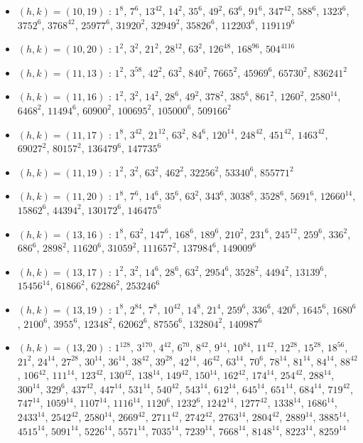 \begin{itemize}
\item $(h,k)=(10,19)$ : $1^{8}$, $7^{6}$, $13^{42}$, $14^{2}$, $35^{6}$, $49^{2}$, $63^{6}$, $91^{6}$, $347^{42}$, $588^{6}$, $1323^{6}$, $3752^{6}$, $3768^{42}$, $25977^{6}$, $31920^{2}$, $32949^{2}$, $35826^{6}$, $112203^{6}$, $119119^{6}$
\item $(h,k)=(10,20)$ : $1^{2}$, $3^{2}$, $21^{2}$, $28^{12}$, $63^{2}$, $126^{48}$, $168^{96}$, $504^{4116}$
\item $(h,k)=(11,13)$ : $1^{2}$, $3^{58}$, $42^{2}$, $63^{2}$, $840^{2}$, $7665^{2}$, $45969^{6}$, $65730^{2}$, $836241^{2}$
\item $(h,k)=(11,16)$ : $1^{2}$, $3^{2}$, $14^{2}$, $28^{6}$, $49^{2}$, $378^{2}$, $385^{6}$, $861^{2}$, $1260^{2}$, $2580^{14}$, $6468^{2}$, $11494^{6}$, $60900^{2}$, $100695^{2}$, $105000^{6}$, $509166^{2}$
\item $(h,k)=(11,17)$ : $1^{8}$, $3^{42}$, $21^{12}$, $63^{2}$, $84^{6}$, $120^{14}$, $248^{42}$, $451^{42}$, $1463^{42}$, $69027^{2}$, $80157^{2}$, $136479^{6}$, $147735^{6}$
\item $(h,k)=(11,19)$ : $1^{2}$, $3^{2}$, $63^{2}$, $462^{2}$, $32256^{2}$, $53340^{6}$, $855771^{2}$
\item $(h,k)=(11,20)$ : $1^{8}$, $7^{6}$, $14^{6}$, $35^{6}$, $63^{2}$, $343^{6}$, $3038^{6}$, $3528^{6}$, $5691^{6}$, $12660^{14}$, $15862^{6}$, $44394^{2}$, $130172^{6}$, $146475^{6}$
\item $(h,k)=(13,16)$ : $1^{8}$, $63^{2}$, $147^{6}$, $168^{6}$, $189^{6}$, $210^{2}$, $231^{6}$, $245^{12}$, $259^{6}$, $336^{2}$, $686^{6}$, $2898^{2}$, $11620^{6}$, $31059^{2}$, $111657^{2}$, $137984^{6}$, $149009^{6}$
\item $(h,k)=(13,17)$ : $1^{2}$, $3^{2}$, $14^{6}$, $28^{6}$, $63^{2}$, $2954^{6}$, $3528^{2}$, $4494^{2}$, $13139^{6}$, $15456^{14}$, $61866^{2}$, $62286^{2}$, $253246^{6}$
\item $(h,k)=(13,19)$ : $1^{8}$, $2^{84}$, $7^{8}$, $10^{42}$, $14^{8}$, $21^{4}$, $259^{6}$, $336^{6}$, $420^{6}$, $1645^{6}$, $1680^{6}$, $2100^{6}$, $3955^{6}$, $12348^{2}$, $62062^{6}$, $87556^{6}$, $132804^{2}$, $140987^{6}$
\item $(h,k)=(13,20)$ : $1^{128}$, $3^{170}$, $4^{42}$, $6^{70}$, $8^{42}$, $9^{14}$, $10^{84}$, $11^{42}$, $12^{28}$, $15^{28}$, $18^{56}$, $21^{2}$, $24^{14}$, $27^{28}$, $30^{14}$, $36^{14}$, $38^{42}$, $39^{28}$, $42^{14}$, $46^{42}$, $63^{14}$, $70^{6}$, $78^{14}$, $81^{14}$, $84^{14}$, $88^{42}$, $106^{42}$, $111^{14}$, $123^{42}$, $130^{42}$, $138^{14}$, $149^{42}$, $150^{14}$, $162^{42}$, $174^{14}$, $254^{42}$, $288^{14}$, $300^{14}$, $329^{6}$, $437^{42}$, $447^{14}$, $531^{14}$, $540^{42}$, $543^{14}$, $612^{14}$, $645^{14}$, $651^{14}$, $684^{14}$, $719^{42}$, $747^{14}$, $1059^{14}$, $1107^{14}$, $1116^{14}$, $1120^{6}$, $1232^{6}$, $1242^{14}$, $1277^{42}$, $1338^{14}$, $1686^{14}$, $2433^{14}$, $2542^{42}$, $2580^{14}$, $2669^{42}$, $2711^{42}$, $2742^{42}$, $2763^{14}$, $2804^{42}$, $2889^{14}$, $3885^{14}$, $4515^{14}$, $5091^{14}$, $5226^{14}$, $5571^{14}$, $7035^{14}$, $7239^{14}$, $7668^{14}$, $8148^{14}$, $8223^{14}$, $8259^{14}$

\end{itemize}
